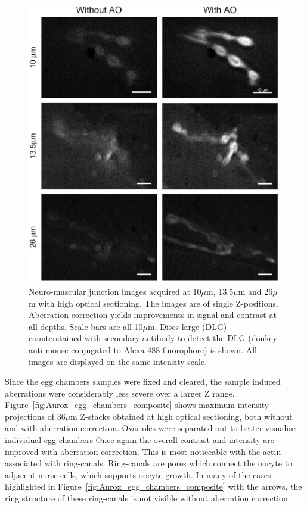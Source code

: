 \begin{figure}[h]
	\centering
	\includegraphics[width=\textwidth]{images/Aurox_depth_comparison_composite.jpg}
	\caption[Depth comparison of the Aurox imaging system]{Neuro-muscular 
		junction images acquired at 10$\mu$m, 13.5$\mu$m and 26$\mu$m with 
		high optical sectioning. The images are of single Z-positions. 
		Aberration correction yields improvements in signal and contrast 
		at all depths. Scale bars are all 10$\mu$m. Discs large (DLG) 
		counterstained with secondary antibody to detect the DLG (donkey 
		anti-mouse conjugated to Alexa 488 fluorophore) is shown. 
		All images are displayed on the same intensity scale.}
	\label{fig:Aurox_depth_comparison_composite}
\end{figure}

Since the egg chambers samples were fixed and cleared, the sample induced 
aberrations were considerably less severe over a larger Z range. 
Figure~\ref{fig:Aurox_egg_chambers_composite} shows maximum intensity 
projections of 36$\mu$m Z-stacks obtained at high optical sectioning, both
without and with aberration correction. Ovarioles were separated out to 
better visualise individual egg-chambers Once again the overall contrast 
and intensity are improved with aberration correction. This is most 
noticeable with the actin associated with ring-canals. Ring-canals are pores 
which connect the oocyte to adjacent nurse cells, which supports oocyte 
growth\cite{loyer2015drosophila}. In many of the cases highlighted in 
Figure~\ref{fig:Aurox_egg_chambers_composite} with the arrows, the ring 
structure of these ring-canals is not visible without aberration correction.

